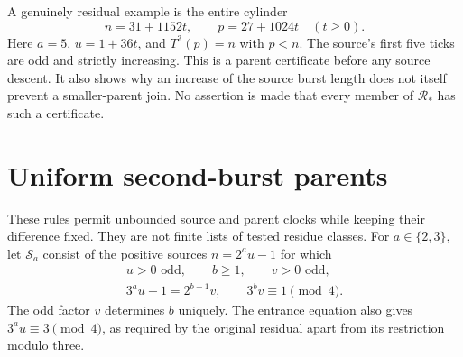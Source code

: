 \documentclass[11pt,letterpaper]{article}
\begin{document}
A genuinely residual example is the entire cylinder
\[
n=31+1152t,\qquad p=27+1024t\quad(t\ge0).
\]
Here \(a=5\), \(u=1+36t\), and \(T^3(p)=n\) with \(p<n\).
The source's first five ticks are odd and strictly increasing.
This is a parent certificate before any source descent. It also shows
why an increase of the source burst length does not itself prevent a
smaller-parent join. No assertion is made that every member of
\(\mathcal R_*\) has such a certificate.

\section{Uniform second-burst parents}

These rules permit unbounded source and parent clocks while keeping their
difference fixed. They are not finite lists of tested residue classes.
For \(a\in\{2,3\}\), let \(\mathcal S_a\) consist of the positive sources
\(n=2^a u-1\) for which
\[
\begin{gathered}
u>0\text{ odd},\qquad b\ge1,\qquad v>0\text{ odd},\\
3^a u+1=2^{b+1}v,\qquad 3^b v\equiv1\pmod4.
\end{gathered}
\]
The odd factor \(v\) determines \(b\) uniquely. The entrance equation
also gives \(3^a u\equiv3\pmod4\), as required by the original residual
apart from its restriction modulo three.
\end{document}
